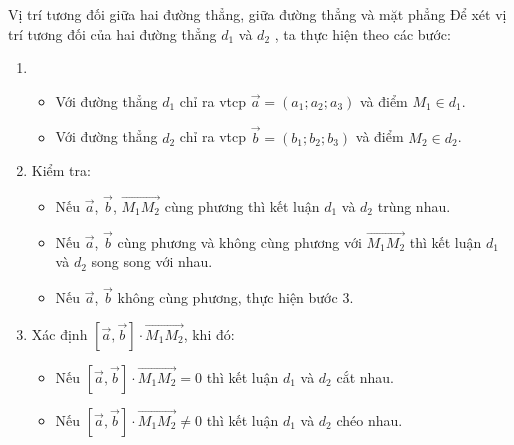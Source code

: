 \begin{dang}{Vị trí tương đối giữa hai đường thẳng, giữa đường thẳng và mặt phẳng }%
	Để xét vị trí tương đối của hai đường thẳng $d_1$ và $d_2$ , ta thực hiện theo các bước:
	\begin{enumerate}
	\item
	\begin{itemize} 
	\item Với đường thẳng $d_1$ chỉ ra vtcp $\vec{a}=(a_1;a_2;a_3)$ và điểm $M_1 \in d_1$.
	\item Với đường thẳng $d_2$ chỉ ra vtcp $\vec{b}=(b_1;b_2;b_3)$ và điểm $M_2 \in d_2$.
	\end{itemize}
	\item 	Kiểm tra:
	\begin{itemize}
	\item Nếu $\vec{a}$, $\vec{b}$, $\vec{M_1M_2}$ cùng phương thì kết luận $d_1$ và $d_2$ trùng nhau.
	\item Nếu $\vec{a}$, $\vec{b}$ cùng phương và không cùng phương với $\vec{M_1M_2}$ thì kết luận $d_1$ và $d_2$ song song với nhau.
	\item Nếu $\vec{a}$, $\vec{b}$ không cùng phương, thực hiện bước 3.
	\end{itemize}
	\item 	Xác định $[\vec{a}, \vec{b}]\cdot\vec{M_1M_2} $, khi đó:
	\begin{itemize}
	\item Nếu $[\vec{a}, \vec{b}]\cdot\vec{M_1M_2}=0 $ thì kết luận $d_1$ và $d_2$ cắt nhau.
	\item Nếu $[\vec{a}, \vec{b}]\cdot\vec{M_1M_2} \neq 0$ thì kết luận $d_1$ và $d_2$ chéo nhau.
	\end{itemize}
	\end{enumerate}
	\end{dang}
\setcounter{subsubsection}{0}
\setcounter{vd}{0}
\setcounter{ex}{0}
